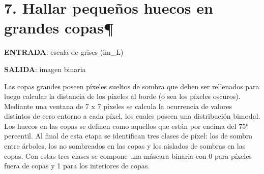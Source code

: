     \begin{tcolorbox}[breakable, size=fbox, boxrule=1pt, pad at break*=1mm,colback=cellbackground, colframe=cellborder]
\begin{Verbatim}[commandchars=\\\{\}]

\end{Verbatim}
\end{tcolorbox}

    \hypertarget{hallar-pequeuxf1os-huecos-en-grandes-copas}{%
\section{7. Hallar pequeños huecos en grandes
copas¶}\label{hallar-pequeuxf1os-huecos-en-grandes-copas}}

\textbf{ENTRADA}: escala de grises (im\_L)

\textbf{SALIDA}: imagen binaria

Las copas grandes poseen píxeles sueltos de sombra que deben ser
rellenados para luego calcular la distancia de los píxeles al borde (o
sea los píxeles oscuros). Mediante una ventana de 7 x 7 píxeles se
calcula la ocurrencia de valores distintos de cero entorno a cada píxel,
los cuales poseen una distribución bimodal. Los huecos en las copas se
definen como aquellos que están por encima del 75° percentil. Al final
de esta etapa se identifican tres clases de píxel: los de sombra entre
árboles, los no sombreados en las copas y los aislados de sombras en las
copas. Con estas tres clases se compone una máscara binaria con 0 para
píxeles fuera de copas y 1 para los interiores de copas.

